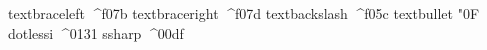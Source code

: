 


\let\typeout\message 



\usetypescript[OmegaArab]
\usetypescript[OmegaLGC]


\startencoding[omega]

   textbraceleft  {^^^^f07b}
   textbraceright {^^^^f07d}
   textbackslash  {^^^^f05c}
   textbullet     {{\clearocplists\mm\sy\char"0F}}
   dotlessi       {^^^^0131}
   ssharp         {^^^^00df}

\stopencoding

\enableencoding [omega]


\unexpanded {}
\unexpanded {}


\def\#{^^^^f023}
\def\${^^^^f024}
\def\%{^^^^f025}
\def\&{^^^^f026}


\def\heshe {\lohi{he} {she}}
\def\himher{\lohi{him}{her}}
\def\hisher{\lohi{his}{her}}


\setuptolerance [verytolerant]

\endinput
